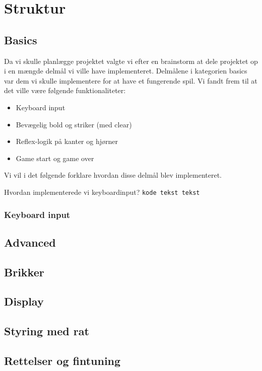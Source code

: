 \chapter{Struktur}
\section{Basics}
Da vi skulle planlægge projektet valgte vi efter en brainstorm at dele projektet op i en mængde delmål vi ville have implementeret. Delmålene i kategorien basics var dem vi skulle implementere for at have et fungerende spil. Vi fandt frem til at det ville være følgende funktionaliteter:
\begin{itemize}
\item Keyboard input
\item Bevægelig bold og striker (med clear)
\item Reflex-logik på kanter og hjørner
\item Game start og game over
\end{itemize}
Vi vil i det følgende forklare hvordan disse delmål blev implementeret. 

Hvordan implementerede vi keyboardinput?
\texttt{kode tekst tekst}

\subsection{Keyboard input}


\section{Advanced}
\section{Brikker}
\section{Display}
\section{Styring med rat}
\section{Rettelser og fintuning}
